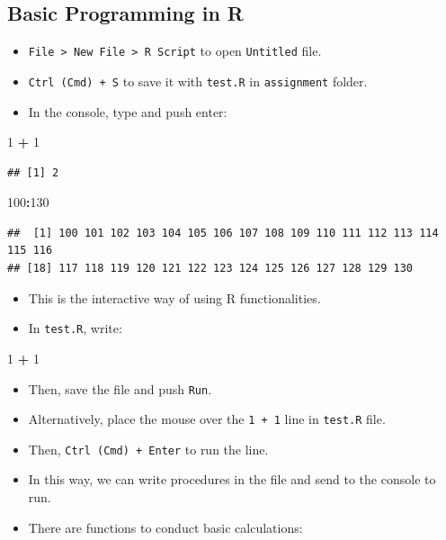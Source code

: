 \documentclass[]{book}
\newenvironment{Shaded}{\begin{snugshade}}{\end{snugshade}}
\newcommand{\DecValTok}[1]{\textcolor[rgb]{0.00,0.00,0.81}{#1}}
\newcommand{\StringTok}[1]{\textcolor[rgb]{0.31,0.60,0.02}{#1}}
\newcommand{\OperatorTok}[1]{\textcolor[rgb]{0.81,0.36,0.00}{\textbf{#1}}}
\providecommand{\tightlist}{%
  \setlength{\itemsep}{0pt}\setlength{\parskip}{0pt}}
\begin{document}
\subsection{Basic Programming in R}\label{basic-programming-in-r}

\begin{itemize}
\tightlist
\item
  \texttt{File\ \textgreater{}\ New\ File\ \textgreater{}\ R\ Script} to
  open \texttt{Untitled} file.
\item
  \texttt{Ctrl\ (Cmd)\ +\ S} to save it with \texttt{test.R} in
  \texttt{assignment} folder.
\item
  In the console, type and push enter:
\end{itemize}

\begin{Shaded}
\begin{Highlighting}[]
\DecValTok{1} \OperatorTok{+}\StringTok{ }\DecValTok{1}
\end{Highlighting}
\end{Shaded}

\begin{verbatim}
## [1] 2
\end{verbatim}

\begin{Shaded}
\begin{Highlighting}[]
\DecValTok{100}\OperatorTok{:}\DecValTok{130}
\end{Highlighting}
\end{Shaded}

\begin{verbatim}
##  [1] 100 101 102 103 104 105 106 107 108 109 110 111 112 113 114 115 116
## [18] 117 118 119 120 121 122 123 124 125 126 127 128 129 130
\end{verbatim}

\begin{itemize}
\tightlist
\item
  This is the interactive way of using R functionalities.
\item
  In \texttt{test.R}, write:
\end{itemize}

\begin{Shaded}
\begin{Highlighting}[]
\DecValTok{1} \OperatorTok{+}\StringTok{ }\DecValTok{1}
\end{Highlighting}
\end{Shaded}

\begin{itemize}
\item
  Then, save the file and push \texttt{Run}.
\item
  Alternatively, place the mouse over the \texttt{1\ +\ 1} line in
  \texttt{test.R} file.
\item
  Then, \texttt{Ctrl\ (Cmd)\ +\ Enter} to run the line.
\item
  In this way, we can write procedures in the file and send to the
  console to run.
\item
  There are functions to conduct basic calculations:
\end{itemize}
\end{document}
